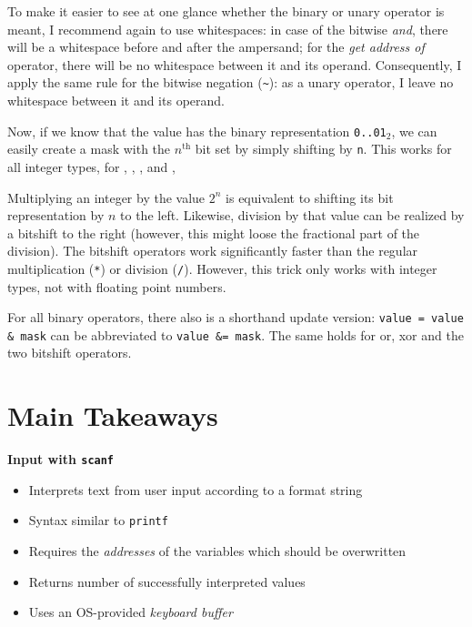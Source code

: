 {\begin{hintbox}
To make it easier to see at one glance whether the binary or unary operator is meant, I recommend again to use whitespaces: in case of the bitwise \emph{and}, there will be a whitespace before and after the ampersand; for the \emph{get address of} operator, there will be no whitespace between it and its operand. Consequently, I apply the same rule for the bitwise negation (\texttt{\textasciitilde}): as a unary operator, I leave no whitespace between it and its operand.
\end{hintbox}

Now, if we know that the value  has the binary representation \texttt{0..01$_2$}, we can easily create a mask with the $n^{\text{th}}$ bit set by simply shifting  by \texttt{n}. This works for all integer types, \ie for , , ,  and , 

\begin{hintbox}
Multiplying an integer by the value $2^n$ is equivalent to shifting its bit representation by $n$ to the left. Likewise, division by that value can be realized by a bitshift to the right (however, this might loose the fractional part of the division). The bitshift operators work significantly faster than the regular multiplication (\texttt{*}) or division (\texttt{/}). However, this trick only works with integer types, not with floating point numbers.
\end{hintbox}

For all binary operators, there also is a shorthand update version: \texttt{value = value \& mask} can be abbreviated to \texttt{value \&= mask}. The same holds for or, xor and the two bitshift operators.

\section{Main Takeaways}
\begin{defbox}
\textbf{Input with \texttt{scanf}}
\begin{itemize}
\item Interprets text from user input according to a format string
\item Syntax similar to \texttt{printf}
\item Requires the \emph{addresses} of the variables which should be overwritten
\item Returns number of successfully interpreted values
\item Uses an OS-provided \emph{keyboard buffer}
\end{itemize}


\end{defbox}}
